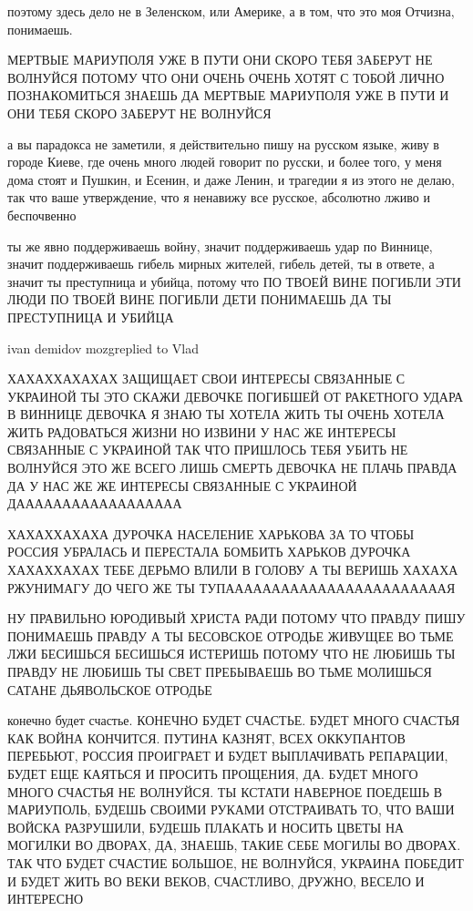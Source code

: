 поэтому здесь дело не в Зеленском, или Америке, а в том, что это моя Отчизна,
понимаешь.

МЕРТВЫЕ МАРИУПОЛЯ УЖЕ В ПУТИ ОНИ СКОРО ТЕБЯ ЗАБЕРУТ НЕ ВОЛНУЙСЯ ПОТОМУ ЧТО ОНИ
ОЧЕНЬ ОЧЕНЬ ХОТЯТ С ТОБОЙ ЛИЧНО ПОЗНАКОМИТЬСЯ ЗНАЕШЬ ДА МЕРТВЫЕ МАРИУПОЛЯ УЖЕ В
ПУТИ И ОНИ ТЕБЯ СКОРО ЗАБЕРУТ НЕ ВОЛНУЙСЯ


а вы парадокса не заметили, я действительно пишу на русском языке, живу в
городе Киеве, где очень много людей говорит по русски, и более того, у меня
дома стоят и Пушкин, и Есенин, и даже Ленин, и трагедии я из этого не делаю,
так что ваше утверждение, что я ненавижу все русское, абсолютно лживо и
беспочвенно

ты же явно поддерживаешь войну, значит поддерживаешь удар по Виннице, значит
поддерживаешь гибель мирных жителей, гибель детей, ты в ответе, а значит ты
преступница и убийца, потому что ПО ТВОЕЙ ВИНЕ ПОГИБЛИ ЭТИ ЛЮДИ ПО ТВОЕЙ ВИНЕ
ПОГИБЛИ ДЕТИ ПОНИМАЕШЬ ДА ТЫ ПРЕСТУПНИЦА И УБИЙЦА

ivan demidov mozgreplied to Vlad

ХАХАХХАХАХАХ ЗАЩИЩАЕТ СВОИ ИНТЕРЕСЫ СВЯЗАННЫЕ С УКРАИНОЙ ТЫ ЭТО СКАЖИ ДЕВОЧКЕ
ПОГИБШЕЙ ОТ РАКЕТНОГО УДАРА В ВИННИЦЕ ДЕВОЧКА Я ЗНАЮ ТЫ ХОТЕЛА ЖИТЬ ТЫ ОЧЕНЬ
ХОТЕЛА ЖИТЬ РАДОВАТЬСЯ ЖИЗНИ НО ИЗВИНИ У НАС ЖЕ ИНТЕРЕСЫ СВЯЗАННЫЕ С УКРАИНОЙ
ТАК ЧТО ПРИШЛОСЬ ТЕБЯ УБИТЬ НЕ ВОЛНУЙСЯ ЭТО ЖЕ ВСЕГО ЛИШЬ СМЕРТЬ ДЕВОЧКА НЕ
ПЛАЧЬ ПРАВДА ДА У НАС ЖЕ ЖЕ ИНТЕРЕСЫ СВЯЗАННЫЕ С УКРАИНОЙ ДАААААААААААААААААА

ХАХАХХАХАХА ДУРОЧКА НАСЕЛЕНИЕ ХАРЬКОВА ЗА ТО ЧТОБЫ РОССИЯ УБРАЛАСЬ И ПЕРЕСТАЛА
БОМБИТЬ ХАРЬКОВ ДУРОЧКА ХАХАХХАХАХ ТЕБЕ ДЕРЬМО ВЛИЛИ В ГОЛОВУ А ТЫ ВЕРИШЬ
ХАХАХА РЖУНИМАГУ ДО ЧЕГО ЖЕ ТЫ ТУПААААААААААААААААААААААААЯ

НУ ПРАВИЛЬНО ЮРОДИВЫЙ ХРИСТА РАДИ ПОТОМУ ЧТО ПРАВДУ ПИШУ ПОНИМАЕШЬ ПРАВДУ А ТЫ
БЕСОВСКОЕ ОТРОДЬЕ ЖИВУЩЕЕ ВО ТЬМЕ ЛЖИ БЕСИШЬСЯ БЕСИШЬСЯ ИСТЕРИШЬ ПОТОМУ ЧТО НЕ
ЛЮБИШЬ ТЫ ПРАВДУ НЕ ЛЮБИШЬ ТЫ СВЕТ ПРЕБЫВАЕШЬ ВО ТЬМЕ МОЛИШЬСЯ САТАНЕ
ДЬЯВОЛЬСКОЕ ОТРОДЬЕ

конечно будет счастье. КОНЕЧНО БУДЕТ СЧАСТЬЕ. БУДЕТ МНОГО СЧАСТЬЯ КАК ВОЙНА
КОНЧИТСЯ. ПУТИНА КАЗНЯТ, ВСЕХ ОККУПАНТОВ ПЕРЕБЬЮТ, РОССИЯ ПРОИГРАЕТ И БУДЕТ
ВЫПЛАЧИВАТЬ РЕПАРАЦИИ, БУДЕТ ЕЩЕ КАЯТЬСЯ И ПРОСИТЬ ПРОЩЕНИЯ, ДА. БУДЕТ МНОГО
МНОГО СЧАСТЬЯ НЕ ВОЛНУЙСЯ. ТЫ КСТАТИ НАВЕРНОЕ ПОЕДЕШЬ В МАРИУПОЛЬ, БУДЕШЬ
СВОИМИ РУКАМИ ОТСТРАИВАТЬ ТО, ЧТО ВАШИ ВОЙСКА РАЗРУШИЛИ, БУДЕШЬ ПЛАКАТЬ И
НОСИТЬ ЦВЕТЫ НА МОГИЛКИ ВО ДВОРАХ, ДА, ЗНАЕШЬ, ТАКИЕ СЕБЕ МОГИЛЫ ВО ДВОРАХ. ТАК
ЧТО БУДЕТ СЧАСТИЕ БОЛЬШОЕ, НЕ ВОЛНУЙСЯ, УКРАИНА ПОБЕДИТ И БУДЕТ ЖИТЬ ВО ВЕКИ
ВЕКОВ, СЧАСТЛИВО, ДРУЖНО, ВЕСЕЛО И ИНТЕРЕСНО

